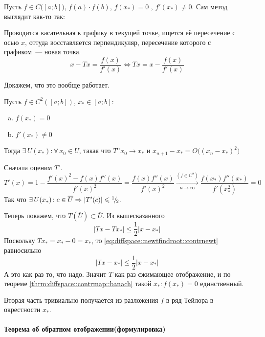 \documentclass[12pt,timbord]{../../../notes}
\begin{document}
Пусть $f\in C\bigl([a;b]\bigr)$, $f(a)\cdot f(b)$, $f(x_*) = 0$ , $f'(x_*) \neq 0$. 
Сам метод выглядит как-то так:

\noindent
Проводится касательная к графику в текущей точке, ищется её пересечение с осью $x$, 
оттуда восставляется перпендикуляр, пересечение которого с графиком~--- новая точка.
\[
  x - T x = \frac{f(x)}{f'(x)} \Leftrightarrow Tx = x - \frac{f(x)}{f'(x)}
\]

Докажем, что это вообще работает.
\begin{thrm}\label{thrm:diffspace::newtfindroot}
  Пусть $f\in C^2\left([a;b]\right)$, $x_* \in [a;b]$:
  \begin{enumerate}[a)]
    \item $f(x_*) = 0$
    \item $f'(x_*) \neq 0$
  \end{enumerate}
  Тогда $\exists\, U(x_*) \colon \forall\, x_0 \in U$, такая что $T^n x_0 \to x_*$ и
  $x_{n+1} - x_* = O\bigl((x_n -x_*)^2\bigr)$
\end{thrm}
\begin{ittproof}
  Сначала оценим $T'$.
  \[
    T'(x) = 1 - \frac{f'(x)^2 - f(x)f''(x)}{f'(x)^2} = \frac{f(x)f''(x)}{f'(x)^2} 
    \xrightarrow[n\to \infty]{(f\in C^2)} \frac{f(x_*)f''(x_*)}{f'(x_*^2)} 
    = 0
  \]
  Так что $\exists\, U(x_*) \colon c \in \overline{U} \Rightarrow |T'(c)| \leqslant {}^{1}\!/_{\!2}$.
  
  Теперь покажем, что $T(\overline{U}) \subset \overline{U}$. Из вышесказанного
  \begin{equation}
    |Tx - Tx_*| \leqslant \frac{1}{2} |x-x_*|
    \label{eq:diffspace::newtfindroot::contrnewt}
  \end{equation}
  Поскольку $Tx_* = x_* - 0 = x_*$, то \eqref{eq:diffspace::newtfindroot::contrnewt} равносильно
  \[
    | Tx - x_* | \leqslant \frac{1}{2} |x-x_*| 
  \]
  А это как раз то, что надо. 
  Значит $T$ как раз сжимающее отображение, и  по теореме \ref{thrm:diffspace::contrmap::banach} 
  такой $x_*\colon f(x_*) = 0$ единственный.

  Вторая часть тривиально получается из разложения $f$ в ряд Тейлора в окрестности $x_*$.
\end{ittproof}

\paragraph{Теорема об обратном отображении(формулировка)}
\label{par:diffspace::invmaphandwave}
\end{document}
